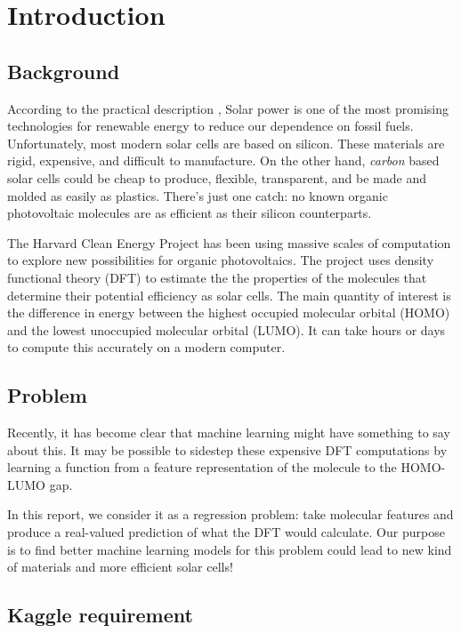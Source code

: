 \chapter{Introduction}

\section{Background}

According to the practical description \cite{WinNT}, Solar power is one of the most promising technologies for renewable energy to reduce our dependence on fossil fuels. Unfortunately, most modern solar cells are based on silicon. These materials are rigid, expensive, and difficult to manufacture. On the other hand, \emph{carbon} based solar cells could be cheap to produce, flexible, transparent, and be made and molded as easily as plastics. There's just one catch: no known organic photovoltaic molecules are as efficient as their silicon counterparts.

The Harvard Clean Energy Project has been using massive scales of computation to explore new possibilities for organic photovoltaics. The project uses density functional theory (DFT) to estimate the the properties of the molecules that determine their potential efficiency as solar cells. The main quantity of interest is the difference in energy between the highest occupied molecular orbital (HOMO) and the lowest unoccupied molecular orbital (LUMO). It can take hours or days to compute this accurately on a modern computer.

\section{Problem}

Recently, it has become clear that machine learning might have something to say about this. It may be possible to sidestep these expensive DFT computations by learning a function from a feature representation of the molecule to the HOMO-LUMO gap. 

In this report, we consider it as a regression problem: take molecular features and produce a real-valued prediction of what the DFT would calculate. Our purpose is to find better machine learning models for this problem could lead to new kind of materials and more efficient solar cells!

\section{Kaggle requirement}

